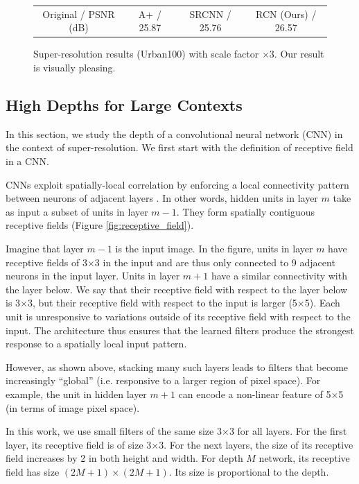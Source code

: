 \documentclass[10pt,twocolumn,letterpaper]{article}
\begin{document}
\begin{figure}
\begin{center}
\begin{tabular}{cccc}
\\
Original / PSNR (dB) &A+ / 25.87 &SRCNN / 25.76 &RCN (Ours) / 26.57 \\
\end{tabular}
\end{center}
\vspace{-.5cm}
\caption{Super-resolution results (Urban100) with scale factor $\times$3. Our result is visually pleasing.}\label{fig:c3}
\end{figure}

\subsection{High Depths for Large Contexts}
In this section, we study the depth of a convolutional neural network (CNN) in the context of super-resolution. We first start with the definition of receptive field in a CNN. 

CNNs exploit spatially-local correlation by enforcing a local connectivity pattern between neurons of adjacent layers \cite{Bengio-et-al-2015-Book}. In other words, hidden units in layer $m$ take as input a subset of units in layer $m-1$. They form spatially contiguous receptive fields (Figure \ref{fig:receptive_field}).

Imagine that layer $m-1$ is the input image. In the figure, units in layer $m$ have receptive fields of 3$\times$3 in the input and are thus only connected to 9 adjacent neurons in the input layer. Units in layer $m+1$ have a similar connectivity with the layer below. We say that their receptive field with respect to the layer below is 3$\times$3, but their receptive field with respect to the input is larger (5$\times$5). Each unit is unresponsive to variations outside of its receptive field with respect to the input. The architecture thus ensures that the learned filters produce the strongest response to a spatially local input pattern.

However, as shown above, stacking many such layers leads to filters that become increasingly “global” (i.e. responsive to a larger region of pixel space). For example, the unit in hidden layer $m+1$ can encode a non-linear feature of 5$\times$5 (in terms of image pixel space).

In this work, we use small filters of the same size 3$\times$3 for all layers. For the first layer, its receptive field is of size 3$\times$3. For the next layers, the size of its receptive field increases by 2 in both height and width. For depth $M$ network, its receptive field has size $(2M+1)\times(2M+1)$. Its size is proportional to the depth.
\end{document}
